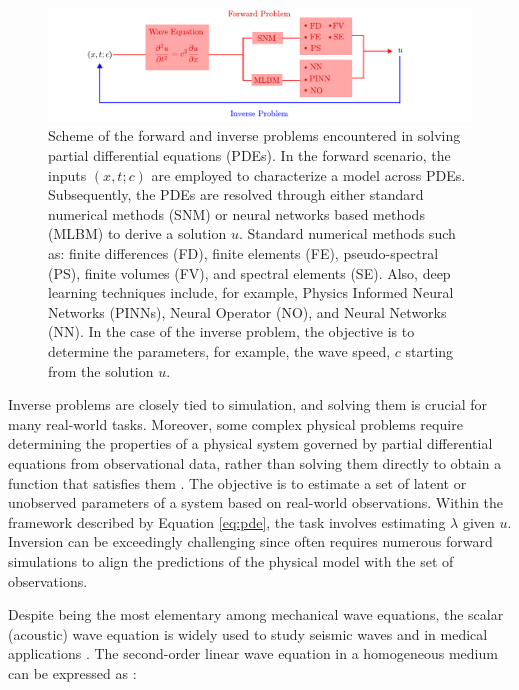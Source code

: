 \documentclass[11pt,twoside]{article}
\begin{document}
\begin{figure}[h]
\includegraphics{figs/forward_inverse_modeling_waves.pdf}
    \caption{Scheme of the forward and inverse problems encountered in solving partial differential equations (PDEs). In the forward 
    scenario, the inputs $(x,t;c)$ are employed to characterize a model across PDEs. Subsequently, the PDEs are resolved through 
    either standard numerical methods (SNM) or neural networks based methods (MLBM) to derive a solution $u$. Standard numerical 
    methods such as: finite differences (FD), finite elements (FE), pseudo-spectral (PS), finite volumes (FV), and spectral 
    elements (SE). Also, deep learning techniques include, for example, Physics Informed Neural Networks (PINNs), Neural Operator 
    (NO), and Neural Networks (NN). In the case of the inverse problem, the objective is to determine the parameters, for example, 
    the wave speed, $c$ starting from the solution $u$.}
    \label{fig:forward_inverse}
\end{figure}

Inverse problems are closely tied to simulation, and solving them is crucial for many real-world tasks. Moreover, some complex physical 
problems require determining the properties of a physical system governed by partial differential equations from observational data, 
rather than solving them directly to obtain a function that satisfies them 
\citep{galiounas_battery_2022, ren_seismicnet_2024,mccann_convolutional_2017}. The objective is to estimate a set of latent or 
unobserved parameters of a system based on real-world observations. Within the framework described by Equation \ref{eq:pde}, 
the task involves estimating $\lambda$ given $u$. Inversion can be exceedingly challenging since often requires numerous forward 
simulations to align the predictions of the physical model with the set of observations. 

Despite being the most elementary among mechanical wave equations, the scalar (acoustic) wave equation is widely used to study seismic waves and 
in medical applications \citep{moseley_physics-informed_2022, alkhadhr_wave_2023}. The second-order linear wave equation in a homogeneous 
medium can be expressed as \citep{Carcione2002}:
\end{document}
